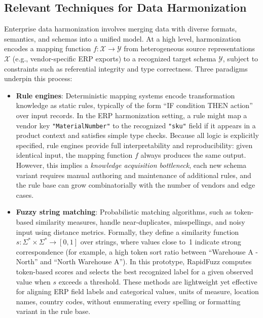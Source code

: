 \documentclass{article}
\begin{document}
\subsection{Relevant Techniques for Data Harmonization}
Enterprise data harmonization involves merging data with diverse formats, semantics, and schemas
into a unified model.\autocite{doan2012principles}
At a high level, harmonization encodes a mapping function \(f : \mathcal{X} \rightarrow
\mathcal{Y}\) from heterogeneous source representations \(\mathcal{X}\) (e.g., vendor-specific
ERP exports) to a recognized target schema \(\mathcal{Y}\), subject to constraints such as
referential integrity and type correctness. Three paradigms underpin this process:

\begin{itemize}
  \item \textbf{Rule engines}: Deterministic mapping systems encode transformation knowledge as
  static rules, typically of the form ``IF condition THEN action'' over input
  records.\autocite{forgy1982rete,giarratano2005expert}
  In the ERP harmonization setting, a rule might map a vendor key \texttt{"MaterialNumber"} to
  the recognized \texttt{"sku"} field if it appears in a product context and satisfies simple
  type checks.
  Because all logic is explicitly specified, rule engines provide full interpretability and
  reproducibility: given identical input, the mapping function \(f\) always produces the same
  output.
  However, this implies a \emph{knowledge acquisition bottleneck}, each new schema variant
  requires manual authoring and maintenance of additional rules, and the rule base can grow
  combinatorially with the number of vendors and edge cases.

  \item \textbf{Fuzzy string matching}: Probabilistic matching algorithms, such as token-based
  similarity measures, handle near-duplicates, misspellings, and noisy input using distance
  metrics.\autocite{cohen2003comparison}
  Formally, they define a similarity function \(s: \Sigma^\ast \times \Sigma^\ast \rightarrow
  [0,1]\) over strings, where values close to~1 indicate strong correspondence (for example, a
  high token sort ratio between ``Warehouse A - North'' and ``North Warehouse A'').
  In this prototype, RapidFuzz computes token-based scores and selects the best recognized label
  for a given observed value when \(s\) exceeds a
  threshold.\autocite{rapidfuzz2020github,cran2024rapidfuzz}
  These methods are lightweight yet effective for aligning ERP field labels and categorical
  values, units of measure, location names, country codes, without enumerating every spelling
  or formatting variant in the rule base.


\end{itemize}
\end{document}
